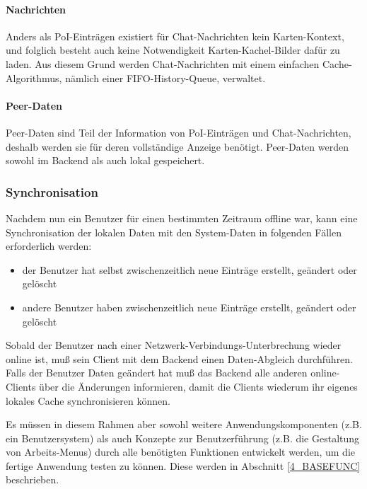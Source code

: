 \paragraph{Nachrichten}
Anders als PoI-Einträgen existiert für Chat-Nachrichten kein Karten-Kontext, und folglich besteht auch keine Notwendigkeit Karten-Kachel-Bilder dafür zu laden. Aus diesem Grund werden
Chat-Nachrichten mit einem einfachen Cache-Algorithmus, nämlich einer FIFO-History-Queue, verwaltet.

\paragraph{Peer-Daten}
Peer-Daten sind Teil der Information von PoI-Einträgen und Chat-Nachrichten, deshalb werden sie für deren vollständige Anzeige benötigt. Peer-Daten werden sowohl im Backend als auch lokal gespeichert.

\subsubsection{Synchronisation}
Nachdem nun ein Benutzer für einen bestimmten Zeitraum offline war, kann eine Synchronisation
der lokalen Daten mit den System-Daten in folgenden Fällen erforderlich werden:
	\begin{itemize}
		\item der Benutzer hat selbst zwischenzeitlich neue Einträge erstellt, geändert oder gelöscht
		\item andere Benutzer haben zwischenzeitlich neue Einträge erstellt, geändert oder gelöscht
	\end{itemize}
Sobald der Benutzer nach einer Netzwerk-Verbindungs-Unterbrechung wieder online ist, muß sein Client mit dem Backend einen Daten-Abgleich durchführen. Falls der Benutzer Daten geändert hat muß das Backend alle anderen online-Clients über die Änderungen informieren, damit die Clients wiederum ihr eigenes lokales Cache synchronisieren können.

Es müssen in diesem Rahmen aber sowohl weitere Anwendungskomponenten (z.B. ein Benutzersystem) als auch Konzepte zur Benutzerführung (z.B. die Gestaltung von Arbeits-Menus) durch alle benötigten Funktionen entwickelt werden, um die fertige Anwendung testen zu können. Diese werden in Abschnitt \ref{4_BASEFUNC} beschrieben.

